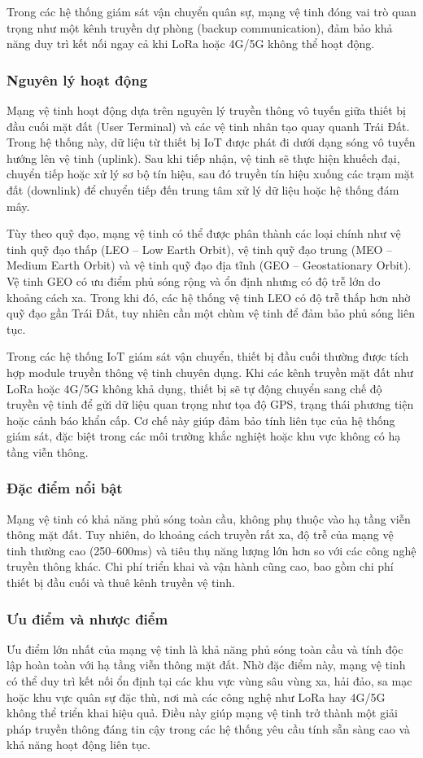Trong các hệ thống giám sát vận chuyển quân sự, mạng vệ tinh đóng vai trò quan trọng
như một kênh truyền dự phòng (backup communication), đảm bảo khả năng duy trì kết nối
ngay cả khi LoRa hoặc 4G/5G không thể hoạt động.

\subsubsection{Nguyên lý hoạt động}
Mạng vệ tinh hoạt động dựa trên nguyên lý truyền thông vô tuyến giữa thiết bị đầu cuối mặt đất (User Terminal) và các vệ tinh nhân tạo quay quanh Trái Đất. Trong hệ thống này, dữ liệu từ thiết bị IoT được phát đi dưới dạng sóng vô tuyến hướng lên vệ tinh (uplink). Sau khi tiếp nhận, vệ tinh sẽ thực hiện khuếch đại, chuyển tiếp hoặc xử lý sơ bộ tín hiệu, sau đó truyền tín hiệu xuống các trạm mặt đất (downlink) để chuyển tiếp đến trung tâm xử lý dữ liệu hoặc hệ thống đám mây.

Tùy theo quỹ đạo, mạng vệ tinh có thể được phân thành các loại chính như vệ tinh quỹ đạo thấp (LEO – Low Earth Orbit), vệ tinh quỹ đạo trung (MEO – Medium Earth Orbit) và vệ tinh quỹ đạo địa tĩnh (GEO – Geostationary Orbit). Vệ tinh GEO có ưu điểm phủ sóng rộng và ổn định nhưng có độ trễ lớn do khoảng cách xa. Trong khi đó, các hệ thống vệ tinh LEO có độ trễ thấp hơn nhờ quỹ đạo gần Trái Đất, tuy nhiên cần một chùm vệ tinh để đảm bảo phủ sóng liên tục.

Trong các hệ thống IoT giám sát vận chuyển, thiết bị đầu cuối thường được tích hợp module truyền thông vệ tinh chuyên dụng. Khi các kênh truyền mặt đất như LoRa hoặc 4G/5G không khả dụng, thiết bị sẽ tự động chuyển sang chế độ truyền vệ tinh để gửi dữ liệu quan trọng như tọa độ GPS, trạng thái phương tiện hoặc cảnh báo khẩn cấp. Cơ chế này giúp đảm bảo tính liên tục của hệ thống giám sát, đặc biệt trong các môi trường khắc nghiệt hoặc khu vực không có hạ tầng viễn thông.

\subsubsection{Đặc điểm nổi bật}
Mạng vệ tinh có khả năng phủ sóng toàn cầu, không phụ thuộc vào hạ tầng viễn thông
mặt đất. Tuy nhiên, do khoảng cách truyền rất xa, độ trễ của mạng vệ tinh thường cao
(250--600ms) và tiêu thụ năng lượng lớn hơn so với các công nghệ truyền thông khác.
Chi phí triển khai và vận hành cũng cao, bao gồm chi phí thiết bị đầu cuối và thuê
kênh truyền vệ tinh.

\subsubsection{Ưu điểm và nhược điểm}
Ưu điểm lớn nhất của mạng vệ tinh là khả năng phủ sóng toàn cầu và tính độc lập hoàn toàn với hạ tầng viễn thông mặt đất. Nhờ đặc điểm này, mạng vệ tinh có thể duy trì kết nối ổn định tại các khu vực vùng sâu vùng xa, hải đảo, sa mạc hoặc khu vực quân sự đặc thù, nơi mà các công nghệ như LoRa hay 4G/5G không thể triển khai hiệu quả. Điều này giúp mạng vệ tinh trở thành một giải pháp truyền thông đáng tin cậy trong các hệ thống yêu cầu tính sẵn sàng cao và khả năng hoạt động liên tục.

